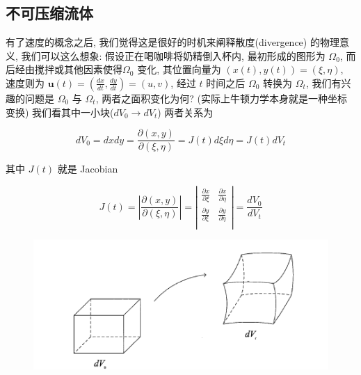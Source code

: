 \documentclass[11pt]{article}
\begin{document}
\subsection{\kaishu 不可压缩流体}

有了速度的概念之后, 我们觉得这是很好的时机来阐释散度(divergence) 的物理意义, 我们可以这么想象: 假设正在喝咖啡将奶精倒入杯内, 最初形成的图形为 $ \Omega_{0} $, 而后经由搅拌或其他因素使得$ \Omega_{0} $ 变化, 其位置向量为 $\left( {x\left( t \right),y\left( t \right)} \right) = \left( {\xi ,\eta } \right)$, 速度则为 $ \boldsymbol{u}\left(t\right)  = \left( {\frac{{dx}}{{dt}},\frac{{dy}}{{dt}}} \right) = \left( {u,v} \right)$, 经过 $ t $ 时间之后 $ \Omega_{0} $ 转换为 $ \Omega_{t} $, 我们有兴趣的问题是 $ \Omega_{0} $ 与 $ \Omega_{t} $, 两者之面积变化为何? (实际上牛顿力学本身就是一种坐标变换) 我们看其中一小块($d{V_0} \to d{V_t}$) 两者关系为

\begin{equation}
d{V_0} = dxdy = \frac{{\partial \left( {x,y} \right)}}{{\partial \left( {\xi ,\eta } \right)}} = J\left( t \right)d\xi d\eta  = J\left( t \right)d{V_t}
\label{eq5.2.1}
\end{equation}

其中 $J\left( t \right)$ 就是 Jacobian

\begin{equation}
J\left( t \right) = \left| {\frac{{\partial \left( {x,y} \right)}}{{\partial \left( {\xi ,\eta } \right)}}} \right| = \left| {\begin{matrix}
	{\frac{{\partial x}}{{\partial \xi }}} & {\frac{{\partial x}}{{\partial \eta }}}  \\ 
	{\frac{{\partial y}}{{\partial \xi }}} & {\frac{{\partial y}}{{\partial \eta }}}  \\ 
	\end{matrix} } \right| = \frac{{d{V_0}}}{{d{V_t}}}
\label{eq5.2.2}
\end{equation}

\begin{figure}[!htb]
	\centering
	\includegraphics[width=0.5\linewidth,height=0.25\linewidth]{fig_5_2_1.png}
	\label{img001}
	\caption{}
\end{figure}
\end{document}
